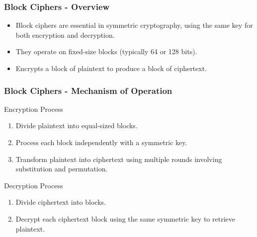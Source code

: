 \documentclass{beamer}
\begin{document}
\begin{frame}[fragile]
    \frametitle{Block Ciphers - Overview}
    \begin{itemize}
        \item Block ciphers are essential in symmetric cryptography, using the same key for both encryption and decryption.
        \item They operate on fixed-size blocks (typically 64 or 128 bits).
        \item Encrypts a block of plaintext to produce a block of ciphertext.
    \end{itemize}
\end{frame}

\begin{frame}[fragile]
    \frametitle{Block Ciphers - Mechanism of Operation}
    \begin{block}{Encryption Process}
        \begin{enumerate}
            \item Divide plaintext into equal-sized blocks.
            \item Process each block independently with a symmetric key.
            \item Transform plaintext into ciphertext using multiple rounds involving substitution and permutation.
        \end{enumerate}
    \end{block}

    \begin{block}{Decryption Process}
        \begin{enumerate}
            \item Divide ciphertext into blocks.
            \item Decrypt each ciphertext block using the same symmetric key to retrieve plaintext.
        \end{enumerate}
    \end{block}
\end{frame}
\end{document}
